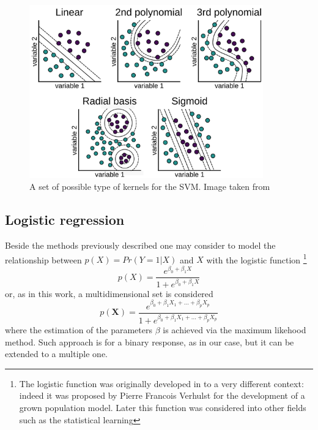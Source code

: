 \documentclass[
12pt, %
a4paper, %
oneside, %
headinclude,footinclude, %
BCOR5mm, %
]{scrartcl}
\begin{document}
\begin{figure}[h]
\begin{center}
\includegraphics[width=0.9\textwidth]{Pic/Kernels_Type.png}
\caption{A set of possible type of kernels for the SVM. Image taken from \cite{ker_svm}}
\label{SVM_kernels}
\end{center}
\end{figure}
\subsection{Logistic regression}
Beside the methods previously described one may consider to model the relationship between $p(X)=Pr(Y=1|X)$ and $X$ with the logistic function \footnote{The logistic function was originally developed in to a very different context: indeed it was proposed by Pierre Francois Verhulst \cite{verhulst1838correspondance} for the development of a grown population model. Later this function was considered into other fields such as the statistical learning}  \cite{james2013introduction}
\begin{equation}
p(X)=\dfrac{e^{\beta_{0}+\beta_{1}X}}{1+e^{\beta_{0}+\beta_{1}X}}
\end{equation}
or, as in this work, a multidimensional set is considered \cite{james2013introduction}
\begin{equation}
p(\textbf{X})=\dfrac{e^{\beta_{0}+\beta_{1}X_{1}+...+\beta_{p}X_{p}}}{1+e^{\beta_{0}+\beta_{1}X_{1}+...+\beta_{p}X_{p}}}
\end{equation}
where the estimation of the parameters $\beta$ is achieved via the maximum likehood method. Such approach is for a binary response, as in our case, but it can be extended to a multiple one.
\end{document}
